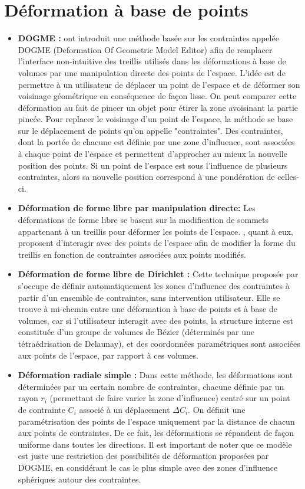 \section{Déformation à base de points}
\begin{itemize}
\item{\textbf{DOGME :}} \cite{BB91} ont introduit une méthode basée
  sur les contraintes appelée DOGME (Deformation Of Geometric Model
  Editor) afin de remplacer l'interface non-intuitive des treillis
  utilisés dans les déformations à base de volumes par une
  manipulation directe des points de l'espace. L'idée est de permettre
  à un utilisateur de déplacer un point de l'espace et de déformer son
  voisinage géométrique en conséquence de façon lisse. On peut
  comparer cette déformation au fait de pincer un objet pour étirer la
  zone avoisinant la partie pincée. Pour replacer le voisinage d'un
  point de l'espace, la méthode se base sur le déplacement de points
  qu'on appelle "contraintes". Des contraintes, dont la portée de
  chacune est définie par une zone d'influence, sont associées à
  chaque point de l'espace et permettent d'approcher au mieux la
  nouvelle position des points. Si un point de l'espace est sous
  l'influence de plusieurs contraintes, alors sa nouvelle position
  correspond à une pondération de celles-ci.
\item{\textbf{Déformation de forme libre par manipulation directe:}}
  Les déformations de forme libre se basent sur la modification de
  sommets appartenant à un treillis pour déformer les points de
  l'espace. \cite{HHK92}, quant à eux, proposent d'interagir avec des
  points de l'espace afin de modifier la forme du treillis en fonction
  de contraintes associées aux points modifiés.
\item{\textbf{Déformation de forme libre de Dirichlet :}} Cette
  technique proposée par \cite{MT97} s'occupe de définir
  automatiquement les zones d'influence des contraintes à partir d'un
  ensemble de contraintes, sans intervention utilisateur. Elle se
  trouve à mi-chemin entre une déformation à base de points et à base
  de volumes, car si l'utilisateur interagit avec des points, la
  structure interne est constituée d'un groupe de volumes de Bézier
  (déterminés par une tétraédrisation de Delaunay), et des coordonnées
  paramétriques sont associées aux points de l'espace, par rapport à
  ces volumes.
\item{\textbf{Déformation radiale simple :}} Dans cette méthode, les
  déformations sont déterminées par un certain nombre de contraintes,
  chacune définie par un rayon $r_i$ (permettant de faire varier la
  zone d'influence) centré sur un point de contrainte $C_i$ associé à
  un déplacement $\Delta C_i$. On définit une paramétrisation des
  points de l'espace uniquement par la distance de chacun aux points
  de contraintes. De ce fait, les déformations se répandent de façon
  uniforme dans toutes les directions. Il est important de noter que
  ce modèle est juste une restriction des possibilités de déformation
  proposées par DOGME, en considérant le cas le plus simple avec des
  zones d'influence sphériques autour des contraintes.
\end{itemize}

